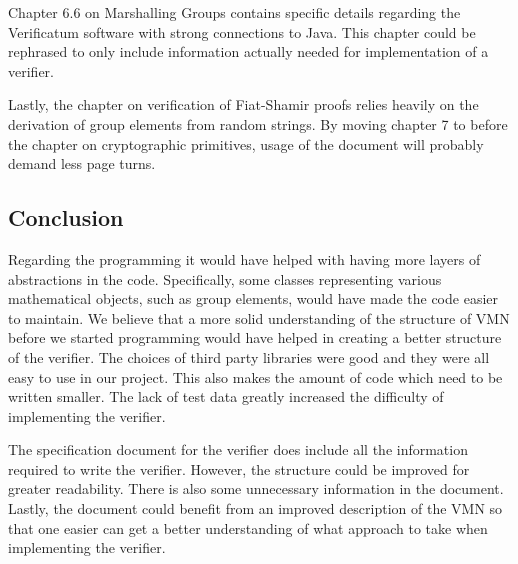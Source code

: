 Chapter 6.6 on Marshalling Groups contains specific details regarding
the Verificatum software with strong connections to Java. This chapter
could be rephrased to only include information actually needed for
implementation of a verifier.

Lastly, the chapter on verification of Fiat-Shamir proofs relies
heavily on the derivation of group elements from random strings. By
moving chapter 7 to before the chapter on cryptographic primitives,
usage of the document will probably demand less page turns.

\subsection{Conclusion}

Regarding the programming it would have helped with having more layers
of abstractions in the code. Specifically, some classes representing
various mathematical objects, such as group elements, would have made
the code easier to maintain. We believe that a more solid
understanding of the structure of VMN before we started programming
would have helped in creating a better structure of the verifier. The
choices of third party libraries were good and they were all easy to
use in our project. This also makes the amount of code which need to
be written smaller. The lack of test data greatly increased the difficulty of implementing the verifier.

The specification document for the verifier does include all the
information required to write the verifier. However, the structure
could be improved for greater readability. There is also some
unnecessary information in the document. Lastly, the document could
benefit from an improved description of the VMN so that one easier can
get a better understanding of what approach to take when implementing
the verifier.
